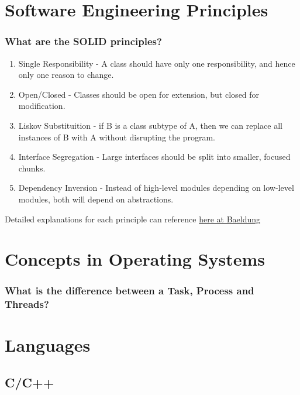 \documentclass[12pt, a4paper]{article}
\begin{document}
\noindent

\tableofcontents

\pagebreak

\section*{Software Engineering Principles}
\subsubsection*{What are the SOLID principles?}
\begin{enumerate}
  \item Single Responsibility - A class should have only one responsibility, and hence only one reason to change.
  \item Open/Closed - Classes should be open for extension, but closed for modification.
  \item Liskov Substituition - if B is a class subtype of A, then we can replace all instances of B with A without disrupting the program.
  \item Interface Segregation - Large interfaces should be split into smaller, focused chunks.
  \item Dependency Inversion - Instead of high-level modules depending on low-level modules, both will depend on abstractions.
\end{enumerate}

Detailed explanations for each principle can reference \href{https://www.baeldung.com/solid-principles}{here at Baeldung}

\pagebreak
{}
\section*{Concepts in Operating Systems}
\subsubsection*{What is the difference between a Task, Process and Threads?}


\pagebreak
{}
\section*{Languages}
\subsection*{C/C++}
\end{document}
